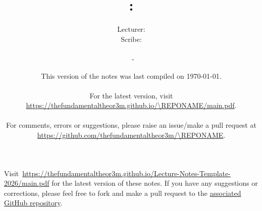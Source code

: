 \documentclass[a4paper, 12pt, openany, oneside]{book}
\title{\vspace{-2em} {\huge \COURSENUMBER: \COURSENAME}}
\author{
    Lecturer: \LECTURER \\
    Scribe: \SCRIBE
    \\ \hfill \\
    \UNIVERSITY\ - \TERM}
\date{
    This version of the notes was last compiled on \today.
    \\ \hfill \\
    For the latest version, visit \url{https://thefundamentaltheor3m.github.io/\REPONAME/main.pdf}.
    \\ \hfill \\
    For comments, errors or suggestions, please raise an issue/make a pull request at \url{https://github.com/thefundamentaltheor3m/\REPONAME}.
}
\def\REPONAME{Lecture-Notes-Template-2026}
\begin{document}
\setlength{\abovedisplayskip}{7.5pt}  %
\setlength{\belowdisplayskip}{7.5pt}  %
\setlength{\abovedisplayshortskip}{2pt}
\setlength{\belowdisplayshortskip}{2pt}

\maketitle
\thispagestyle{empty}

\tableofcontents
\thispagestyle{empty}

\newpage

\nocite{*}





% 

\newpage




\printbibliography[prenote=mybibnote]
\thispagestyle{empty}

Visit~\url{https://thefundamentaltheor3m.github.io/\REPONAME/main.pdf} for the latest version of these notes. If you have any suggestions or corrections, please feel free to fork and make a pull request to the \href{https://github.com/thefundamentaltheor3m/\REPONAME}{associated GitHub repository}.
\end{document}
